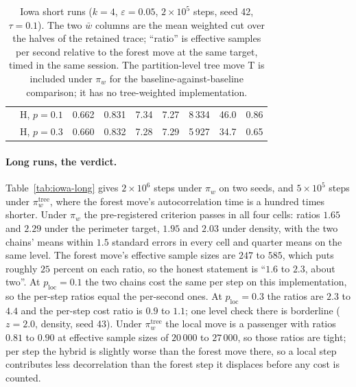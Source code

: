 \documentclass[11pt]{article}
\begin{document}
\begin{table}[htbp]
\begin{tabular}{llrrrrrrr}
 & H, $p{=}0.1$ & 0.662 & 0.831 & 7.34 & 7.27 & 8\,334 & 46.0 & 0.86 \\
 & H, $p{=}0.3$ & 0.660 & 0.832 & 7.28 & 7.29 & 5\,927 & 34.7 & 0.65 \\
\bottomrule
\end{tabular}
\caption{Iowa short runs ($k = 4$, $\varepsilon = 0.05$,
  $2 \times 10^5$ steps, seed 42, $\tau = 0.1$). The two $\bar w$
  columns are the mean weighted cut over the halves of the retained
  trace; ``ratio'' is effective samples per second relative to the
  forest move at the same target, timed in the same session. The
  partition-level tree move T is included under $\pi_w$ for the
  baseline-against-baseline comparison; it has no tree-weighted
  implementation.}\label{tab:iowa-short}
\end{table}

\paragraph{Long runs, the verdict.} Table~\ref{tab:iowa-long} gives
$2 \times 10^6$ steps under $\pi_w$ on two seeds, and $5 \times 10^5$
steps under $\pi_w^{\mathrm{tree}}$, where the forest move's
autocorrelation time is a hundred times shorter. Under $\pi_w$ the
pre-registered criterion passes in all four cells: ratios $1.65$ and
$2.29$ under the perimeter target, $1.95$ and $2.03$ under density,
with the two chains' means within $1.5$ standard errors in every cell
and quarter means on the same level. The forest move's effective
sample sizes are $247$ to $585$, which puts roughly $25$ percent on
each ratio, so the honest statement is ``$1.6$ to $2.3$, about two''.
At $p_{\mathrm{loc}} = 0.1$ the two chains cost the same per step on
this implementation, so the per-step ratios equal the per-second
ones. At $p_{\mathrm{loc}} = 0.3$ the ratios are $2.3$ to $4.4$ and
the per-step cost ratio is $0.9$ to $1.1$; one level check there is
borderline ($z = 2.0$, density, seed 43). Under
$\pi_w^{\mathrm{tree}}$ the local move is a passenger with ratios
$0.81$ to $0.90$ at effective sample sizes of $20\,000$ to $27\,000$,
so those ratios are tight; per step the hybrid is slightly worse than
the forest move there, so a local step contributes less decorrelation
than the forest step it displaces before any cost is counted.
\end{document}
